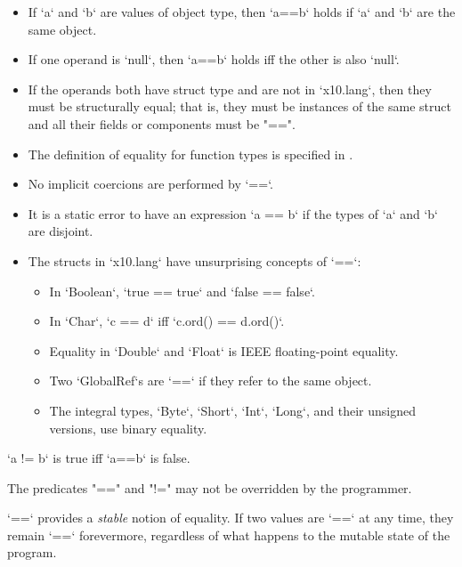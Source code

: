 \begin{itemize}
\item If \xcd`a` and \xcd`b` are values of object type, then \xcd`a==b` holds
      if \xcd`a` and \xcd`b` are the same object.
\item If one operand is \xcd`null`, then \xcd`a==b` holds iff the other is
      also \xcd`null`.
\item If the operands both have struct type and are not in \xcd`x10.lang`, then they must be structurally equal;
that is, they must be instances of the same struct
and all their fields or components must be \xcd"==".   



\item The definition of equality for function types is specified in
      .
\item No implicit coercions are performed by \xcd`==`.  
\item It is a static error to have an expression \xcd`a == b` if the types of
      \xcd`a` and \xcd`b` are disjoint.  

\item The structs in \xcd`x10.lang` have unsurprising concepts of \xcd`==`: 
     \begin{itemize}
     \item In \xcd`Boolean`, \xcd`true == true` and \xcd`false == false`. 
     \item In \xcd`Char`, \xcd`c == d` iff \xcd`c.ord() == d.ord()`.
     \item Equality in \xcd`Double` and \xcd`Float` is IEEE floating-point
           equality. 
     \item Two \xcd`GlobalRef`s are \xcd`==` if they refer to the same object.
     \item The integral types, \xcd`Byte`, \xcd`Short`, \xcd`Int`, \xcd`Long`,
           and their unsigned versions, use binary equality.
     \end{itemize}

\end{itemize}

\xcd`a != b`
is true iff \xcd`a==b` is false.

The predicates \xcd"==" and \xcd"!=" may not be overridden by the programmer.

\xcd`==` provides a {\em stable} notion of equality.  If two values are
\xcd`==` at any time, they remain \xcd`==` forevermore, regardless of what
happens to the mutable state of the program. 

